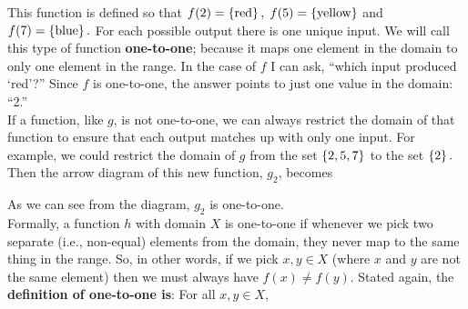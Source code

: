 This function is defined so that $f(2) = \left\{\text{red}\right\}, \; f(5) = \left\{\text{yellow}\right\}$ and $f(7) = \left\{\text{blue}\right\}.$ For each possible output there is one unique input. We will call this type of function \textbf{one-to-one}; because it maps one element in the domain to only one element in the range. In the case of $f$ I can ask, ``which input produced `red'?'' Since $f$ is one-to-one, the answer points to just one value in the domain: ``2.''  \\

\noindent If a function, like $g$, is not one-to-one, we can always restrict the domain of that function to ensure that each output matches up with only one input. For example, we could restrict the domain of $g$ from the set $\left\{2,5,7\right\}$ to the set $\left\{2\right\}.$ Then the arrow diagram of this new function, $g_2$, becomes
\begin{center}
\end{center}
As we can see from the diagram, $g_2$ is one-to-one. \\

\noindent Formally, a function $h$ with domain $X$ is one-to-one if whenever we pick two separate (i.e., non-equal) elements from the domain, they never map to the same thing in the range. So, in other words, if we pick $x,y \in X$ (where $x$ and $y$ are not the same element) then we must always have $f(x) \neq f(y)$. Stated again, the \textbf{definition of one-to-one is}: For all $x,y \in X$,

\bigskip

\hfil{}
\bigskip



